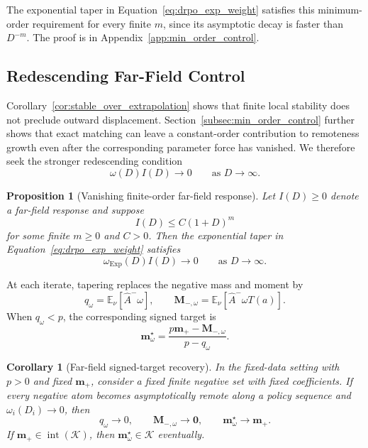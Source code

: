 \documentclass{article}
\theoremstyle{plain}
\newtheorem{proposition}[theorem]{Proposition}
\newtheorem{corollary}[theorem]{Corollary}
\theoremstyle{definition}
\theoremstyle{remark}
\begin{document}
The exponential taper in Equation~\eqref{eq:drpo_exp_weight} satisfies this
minimum-order requirement for every finite \(m\), since its asymptotic decay
is faster than \(D^{-m}\). The proof is in
Appendix~\ref{app:min_order_control}.

\subsection{Redescending Far-Field Control}
\label{sec:redescending_control}

Corollary~\ref{cor:stable_over_extrapolation} shows that finite local
stability does not preclude outward displacement. Section~\ref{subsec:min_order_control}
further shows that exact matching can leave a constant-order contribution to
remoteness growth even after the corresponding parameter force has vanished.
We therefore seek the stronger redescending condition
\[
    \omega(D)I(D)\longrightarrow0
    \qquad\text{as }D\to\infty.
\]

\begin{proposition}[Vanishing finite-order far-field response]
\label{prop:exp_vanishing_influence}
Let \(I(D)\geq0\) denote a far-field response and suppose
\[
    I(D)\leq C(1+D)^m
\]
for some finite \(m\geq0\) and \(C>0\). Then the exponential taper in
Equation~\eqref{eq:drpo_exp_weight} satisfies
\[
    \omega_{\mathrm{Exp}}(D)I(D)\longrightarrow0
    \qquad\text{as }D\to\infty .
\]
\end{proposition}

At each iterate, tapering replaces the negative mass and moment by
\[
    q_\omega
    =
    \mathbb E_\nu[\widehat A^-\omega],
    \qquad
    \mathbf M_{-,\omega}
    =
    \mathbb E_\nu[\widehat A^-\omega T(a)].
\]
When \(q_\omega<p\), the corresponding signed target is
\[
    \mathbf m_\omega^\star
    =
    \frac{p\mathbf m_+-\mathbf M_{-,\omega}}
         {p-q_\omega}.
\]

\begin{corollary}[Far-field signed-target recovery]
\label{cor:tapered_target_recovery}
In the fixed-data setting with \(p>0\) and fixed \(\mathbf m_+\), consider a
fixed finite negative set with fixed coefficients. If every negative atom
becomes asymptotically remote along a policy sequence and
\(\omega_i(D_i)\to0\), then
\[
    q_\omega\to0,
    \qquad
    \mathbf M_{-,\omega}\to\mathbf0,
    \qquad
    \mathbf m_\omega^\star\to\mathbf m_+.
\]
If \(\mathbf m_+\in\operatorname{int}(\mathcal K)\), then
\(\mathbf m_\omega^\star\in\mathcal K\) eventually.
\end{corollary}
\end{document}
